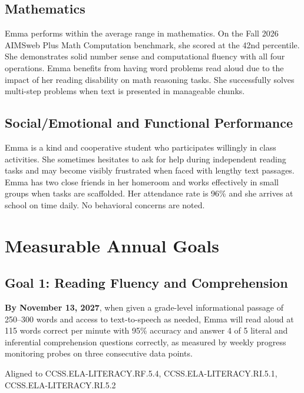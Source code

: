 \documentclass[11pt]{article}
\begin{document}
\subsection{Mathematics}

Emma performs within the average range in mathematics. On the Fall 2026 AIMSweb Plus Math Computation benchmark, she scored at the 42nd percentile. She demonstrates solid number sense and computational fluency with all four operations. Emma benefits from having word problems read aloud due to the impact of her reading disability on math reasoning tasks. She successfully solves multi-step problems when text is presented in manageable chunks.

\subsection{Social/Emotional and Functional Performance}

Emma is a kind and cooperative student who participates willingly in class activities. She sometimes hesitates to ask for help during independent reading tasks and may become visibly frustrated when faced with lengthy text passages. Emma has two close friends in her homeroom and works effectively in small groups when tasks are scaffolded. Her attendance rate is 96\% and she arrives at school on time daily. No behavioral concerns are noted.

\vspace{6pt}

\section{Measurable Annual Goals}

\subsection{Goal 1: Reading Fluency and Comprehension}

\begin{goalbox}
{\bfseries By November 13, 2027}, when given a grade-level informational passage of 250--300 words and access to text-to-speech as needed, Emma will read aloud at 115 words correct per minute with 95\% accuracy and answer 4 of 5 literal and inferential comprehension questions correctly, as measured by weekly progress monitoring probes on three consecutive data points.
\end{goalbox}

\vspace{4pt}
{\footnotesize\color{IEPGray} Aligned to CCSS.ELA-LITERACY.RF.5.4, CCSS.ELA-LITERACY.RI.5.1, CCSS.ELA-LITERACY.RI.5.2}
\end{document}
